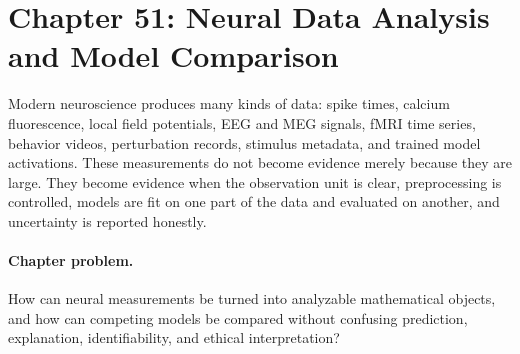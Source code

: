\section{Chapter 51: Neural Data Analysis and Model Comparison}
\label{ch:neural-data-analysis-model-comparison}

Modern neuroscience produces many kinds of data: spike times, calcium fluorescence, local field potentials, EEG and MEG signals, fMRI time series, behavior videos, perturbation records, stimulus metadata, and trained model activations. These measurements do not become evidence merely because they are large. They become evidence when the observation unit is clear, preprocessing is controlled, models are fit on one part of the data and evaluated on another, and uncertainty is reported honestly.

\paragraph{Chapter problem.}
How can neural measurements be turned into analyzable mathematical objects, and how can competing models be compared without confusing prediction, explanation, identifiability, and ethical interpretation?

